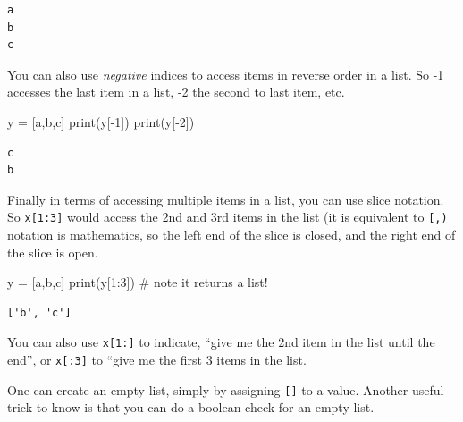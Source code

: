 \documentclass[
  letterpaper,
]{scrbook}
\newenvironment{Shaded}{\begin{snugshade}}{\end{snugshade}}
\newcommand{\BuiltInTok}[1]{\textcolor[rgb]{0.00,0.23,0.31}{#1}}
\newcommand{\CommentTok}[1]{\textcolor[rgb]{0.37,0.37,0.37}{#1}}
\newcommand{\DecValTok}[1]{\textcolor[rgb]{0.68,0.00,0.00}{#1}}
\newcommand{\NormalTok}[1]{\textcolor[rgb]{0.00,0.23,0.31}{#1}}
\newcommand{\OperatorTok}[1]{\textcolor[rgb]{0.37,0.37,0.37}{#1}}
\newcommand{\StringTok}[1]{\textcolor[rgb]{0.13,0.47,0.30}{#1}}
\begin{document}
\begin{verbatim}
a
b
c
\end{verbatim}

You can also use \emph{negative} indices to access items in reverse
order in a list. So -1 accesses the last item in a list, -2 the second
to last item, etc.

\begin{Shaded}
\begin{Highlighting}[]
\NormalTok{y }\OperatorTok{=}\NormalTok{ [}\StringTok{\textquotesingle{}a\textquotesingle{}}\NormalTok{,}\StringTok{\textquotesingle{}b\textquotesingle{}}\NormalTok{,}\StringTok{\textquotesingle{}c\textquotesingle{}}\NormalTok{]}
\BuiltInTok{print}\NormalTok{(y[}\OperatorTok{{-}}\DecValTok{1}\NormalTok{])}
\BuiltInTok{print}\NormalTok{(y[}\OperatorTok{{-}}\DecValTok{2}\NormalTok{])}
\end{Highlighting}
\end{Shaded}

\begin{verbatim}
c
b
\end{verbatim}

Finally in terms of accessing multiple items in a list, you can use
slice notation. So \texttt{x{[}1:3{]}} would access the 2nd and 3rd
items in the list (it is equivalent to \texttt{{[},)} notation is
mathematics, so the left end of the slice is closed, and the right end
of the slice is open.

\begin{Shaded}
\begin{Highlighting}[]
\NormalTok{y }\OperatorTok{=}\NormalTok{ [}\StringTok{\textquotesingle{}a\textquotesingle{}}\NormalTok{,}\StringTok{\textquotesingle{}b\textquotesingle{}}\NormalTok{,}\StringTok{\textquotesingle{}c\textquotesingle{}}\NormalTok{]}
\BuiltInTok{print}\NormalTok{(y[}\DecValTok{1}\NormalTok{:}\DecValTok{3}\NormalTok{]) }\CommentTok{\# note it returns a list!}
\end{Highlighting}
\end{Shaded}

\begin{verbatim}
['b', 'c']
\end{verbatim}

You can also use \texttt{x{[}1:{]}} to indicate, ``give me the 2nd item
in the list until the end'', or \texttt{x{[}:3{]}} to ``give me the
first 3 items in the list.

One can create an empty list, simply by assigning \texttt{{[}{]}} to a
value. Another useful trick to know is that you can do a boolean check
for an empty list.
\end{document}
